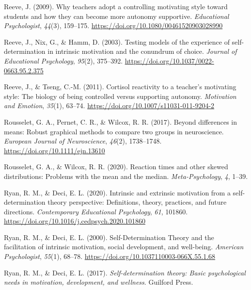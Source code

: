 \documentclass[
  doc, donotrepeattitle,floatsintext]{apa7}
\newlength{\cslhangindent}
\newlength{\cslentryspacingunit} %
\newenvironment{CSLReferences}[2] %
 {%
  \setlength{\parindent}{0pt}
  \ifodd #1
  \let\oldpar\par
  \def\par{\hangindent=\cslhangindent\oldpar}
  \fi
  \setlength{\parskip}{#2\cslentryspacingunit}
 }%
 {}
\begin{document}
\begin{CSLReferences}{1}{0}
\leavevmode{}%
Reeve, J. (2009). Why teachers adopt a controlling motivating style toward students and how they can become more autonomy supportive. \emph{Educational Psychologist}, \emph{44}(3), 159--175. \url{https://doi.org/10.1080/00461520903028990}

\leavevmode{}%
Reeve, J., Nix, G., \& Hamm, D. (2003). Testing models of the experience of self-determination in intrinsic motivation and the conundrum of choice. \emph{Journal of Educational Psychology}, \emph{95}(2), 375--392. \url{https://doi.org/10.1037/0022-0663.95.2.375}

\leavevmode{}%
Reeve, J., \& Tseng, C.-M. (2011). Cortisol reactivity to a teacher's motivating style: {The} biology of being controlled versus supporting autonomy. \emph{Motivation and Emotion}, \emph{35}(1), 63--74. \url{https://doi.org/10.1007/s11031-011-9204-2}

\leavevmode{}%
Rousselet, G. A., Pernet, C. R., \& Wilcox, R. R. (2017). Beyond differences in means: Robust graphical methods to compare two groups in neuroscience. \emph{European Journal of Neuroscience}, \emph{46}(2), 1738--1748. \url{https://doi.org/10.1111/ejn.13610}

\leavevmode{}%
Rousselet, G. A., \& Wilcox, R. R. (2020). Reaction times and other skewed distributions: Problems with the mean and the median. \emph{Meta-Psychology}, \emph{4}, 1--39.

\leavevmode{}%
Ryan, R. M., \& Deci, E. L. (2020). Intrinsic and extrinsic motivation from a self-determination theory perspective: {Definitions}, theory, practices, and future directions. \emph{Contemporary Educational Psychology}, \emph{61}, 101860. \url{https://doi.org/10.1016/j.cedpsych.2020.101860}

\leavevmode{}%
Ryan, R. M., \& Deci, E. L. (2000). Self-{Determination Theory} and the facilitation of intrinsic motivation, social development, and well-being. \emph{American Psychologist}, \emph{55}(1), 68--78. \url{https://doi.org/10.1037110003-066X.55.1.68}

\leavevmode{}%
Ryan, R. M., \& Deci, E. L. (2017). \emph{Self-determination theory: {Basic} psychological needs in motivation, development, and wellness}. {Guilford Press}.


\end{CSLReferences}
\end{document}
